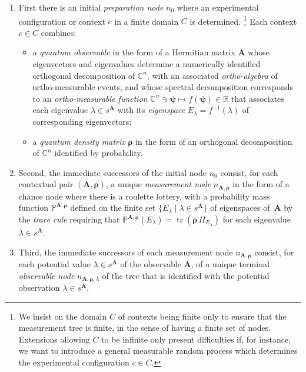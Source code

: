 \documentclass[11pt]{article}
\newcommand \R { \mathbb{R} }
\newcommand \C { \mathbb{C} }
\DeclareMathOperator{\tr}{tr}
\begin{document}
\begin{enumerate}
	\item First there is an initial \emph{preparation node} $ n_0 $ 
	where an experimental configuration or context $c$ in a finite domain $C$ is determined.%
%
\footnote{We insist on the domain $C$ of contexts being finite only to ensure
that the measurement tree is finite, in the sense of having a finite set of nodes.
Extensions allowing $C$ to be infinite only present difficulties if,
for instance, we want to introduce a general measurable random process 
which determines the experimental configuration $c \in C$.}  
%	 
	Each context $c \in C$ combines: 
	\begin{itemize}
		\item a \emph{quantum observable} in the form of a Hermitian matrix $ \mathbf A$
		whose eigenvectors and eigenvalues determine 
		a numerically identified orthogonal decomposition of $ \C^n $,
		with an associated \emph{ortho-algebra} of ortho-measur\-able events,
		and whose spectral decomposition corresponds to an \emph{ortho-measur\-able function}
		\( \C^n \owns \boldsymbol \psi \mapsto f( \boldsymbol \psi ) \in \R \)
		that associates each eigenvalue $ \lambda \in s^\mathbf A$ 
		with its \emph{eigenspace} $ E_\lambda = f^{-1} ( \lambda )$ 
		of corresponding eigenvectors;
		\item a \emph{quantum density matrix} $ \boldsymbol \rho $ in the form 
		of an orthogonal decomposition of $ \C^n $ identified by probability. 
	\end{itemize}
	\item Second, the immediate successors of the initial node $ n_0 $ consist, 
	for each contextual pair $( \mathbf A, \boldsymbol \rho )$, 
	a unique \emph{measurement node} $ n_{ \mathbf A, \boldsymbol \rho }$
	in the form of a chance node where there is a roulette lottery, 
	with a probability mass function $ \mathbb P^{ \mathbf A, \boldsymbol \rho }$ 
	defined on the finite set $ \{ E_\lambda \mid \lambda \in s^\mathbf A \}$ 
	of eigenspaces of~$ \mathbf A$ by the \emph{trace rule} requiring that 
 \( \mathbb P^{ \mathbf A, \boldsymbol \rho } ( E_\lambda ) 
 = \tr ( \boldsymbol \rho \, \Pi _{E _\lambda } ) \)
	for each eigenvalue $ \lambda \in s^\mathbf A$.
	\item Third, the immediate successors 
	of each measurement node $ n_{ \mathbf A, \boldsymbol \rho }$ consist, 
	for each potential value $ \lambda \in s^\mathbf A$ of the observable $ \mathbf A$, 
	of a unique terminal \emph{observable node} $ n_{ \mathbf A, \boldsymbol \rho, \lambda }$ 
	of the tree that is identified with the potential observation $ \lambda \in s^\mathbf A$.
\end{enumerate}
\end{document}
